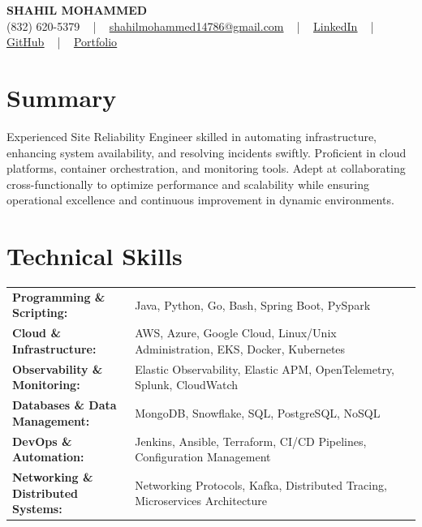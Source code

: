 \documentclass[letterpaper,11pt]{article}
\begin{document}
\begin{center}
    {\fontsize{14pt}{12pt}\selectfont \textbf{\MakeUppercase{Shahil Mohammed}}}\\ \vspace{2pt}
    \fontsize{10pt}{12pt}\selectfont (832) 620-5379 ~ | ~ \href{mailto:shahilmohammed14786@gmail.com}{shahilmohammed14786@gmail.com} ~ | ~  
    \href{https://www.linkedin.com/in/shahil-mohammed-9652931a1/}{\color{blue}\underline{LinkedIn}}  ~ | ~ 
    \href{https://github.com/freakbeast14}{\color{blue}\underline{GitHub}} ~ | ~ 
    \href{https://shahil-mohammed.netlify.app/}{\color{blue}\underline{Portfolio}}
    \vspace{-8pt}
\end{center}

\section{Summary}
\fontsize{9pt}{10pt}\selectfont
Experienced Site Reliability Engineer skilled in automating infrastructure, enhancing system availability, and resolving incidents swiftly. Proficient in cloud platforms, container orchestration, and monitoring tools. Adept at collaborating cross-functionally to optimize performance and scalability while ensuring operational excellence and continuous improvement in dynamic environments.
 \vspace{-5pt}

\section{Technical Skills}
        \vspace{-14pt}
        \begin{table}[h]
            \fontsize{9pt}{10pt}\selectfont
            \begin{tabular}{p{0.3\linewidth} p{0.7\linewidth}}
                \textbf{Programming \& Scripting:} & Java, Python, Go, Bash, Spring Boot, PySpark \\
                \textbf{Cloud \& Infrastructure:} & AWS, Azure, Google Cloud, Linux/Unix Administration, EKS, Docker, Kubernetes \\
                \textbf{Observability \& Monitoring:} & Elastic Observability, Elastic APM, OpenTelemetry, Splunk, CloudWatch \\
                \textbf{Databases \& Data Management:} & MongoDB, Snowflake, SQL, PostgreSQL, NoSQL \\
                \textbf{DevOps \& Automation:} & Jenkins, Ansible, Terraform, CI/CD Pipelines, Configuration Management \\
                \textbf{Networking \& Distributed Systems:} & Networking Protocols, Kafka, Distributed Tracing, Microservices Architecture \\
            \end{tabular}
        \end{table}
 \vspace{-15pt}
\end{document}
